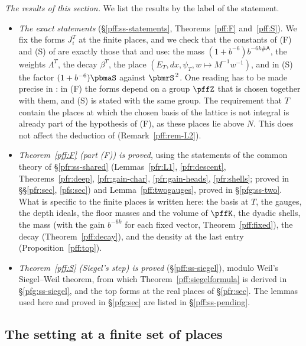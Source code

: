 \documentclass[10pt]{amsart}
\theoremstyle{definition}
\theoremstyle{remark}
\begin{document}
\emph{The results of this section.} We list the results by the label of the statement.
\begin{itemize}
\item[(i)] \emph{The exact statements} (\S\ref{pff:ss-statements}, Theorems~\ref{pff:F}
and~\ref{pff:S}). We fix the forms $J^T_i$ at the finite places, and we check that the
constants of \textup{(F)} and \textup{(S)} of {\cite[Theorem~3.51]{P51}} are exactly those that
{\cite[Theorem~3.53]{P51}} and {\cite[Lemma~3.52]{P51}} use: the mass $(1+b^{-6})b^{-6k\#\mathsf A}$, the
weights $\Lambda^T$, the decay $\beta^T$, the place $(E_T,dx,\psi_T,w\mapsto M^{-1}w^{-1})$, and in
\textup{(S)} the factor $(1+b^{-6})\pbmaS$ against $\pbmrS^{\,2}$. One reading has to be made precise in
{\cite[Theorem~3.51]{P51}}: in \textup{(F)} the forms depend on a group $\pffZ$ that is
chosen together with them, and \textup{(S)} is stated with the same group. The requirement that $T$
contain the places at which the chosen basis of the lattice is not integral is already part of the
hypothesis of \textup{(F)}, as these places lie above $N$. This does not affect the
deduction of {\cite[Theorem~3.53]{P51}} (Remark~\ref{pff:rem-L2}).
\item[(ii)] \emph{Theorem~\ref{pff:F} (part \textup{(F)}) is proved}, using the statements of the
common theory of \S\ref{pfr:ss-shared} (Lemmas~\ref{pfr:L1}, \ref{pfr:descent},
Theorems~\ref{pfr:deep}, \ref{pfr:gain-char}, \ref{pfr:gain-heads}, \ref{pfr:shells}; proved in
\S\S\ref{pfr:sec}, \ref{pfs:sec}) and Lemma~\ref{pff:twogauges}, proved in \S\ref{pfg:ss-two}. What is specific to the finite
places is written here: the basis at $T$, the gauges, the depth ideals, the floor masses and the volume of
$\pffK$, the dyadic shells, the mass (with the gain $b^{-6k}$ for each fixed vector,
Theorem~\ref{pff:fixed}), the decay (Theorem~\ref{pff:decay}), and the density at the last entry
(Proposition~\ref{pff:top}).
\item[(iii)] \emph{Theorem~\ref{pff:S} (Siegel's step) is proved} (\S\ref{pff:ss-siegel}), modulo Weil's Siegel--Weil theorem, from which Theorem~\ref{pff:siegelformula} is derived in \S\ref{pfg:ss-siegel}, and the top forms at the real places of \S\ref{pfr:sec}.
The lemmas used here and proved in \S\ref{pfg:sec} are listed in \S\ref{pff:ss-pending}.
\end{itemize}

\subsection{The setting at a finite set of places}\label{pff:ss-setting}
\end{document}
